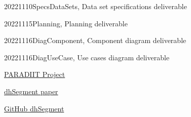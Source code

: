 \documentclass{polytech/polytech}
\numberwithin{figure}{chapter}
\begin{document}
\begin{appendix}
20221110SpecsDataSets, Data set specifications deliverable

20221115Planning, Planning deliverable

20221116DiagComponent, Component diagram deliverable

20221116DiagUseCase, Use cases diagram deliverable

\href{https://sites.google.com/site/paradiitproject/}{PARADIIT Project}

\href{https://arxiv.org/abs/1804.10371}{dhSegment paper}

\href{https://github.com/dhlab-epfl/dhSegment}{GitHub dhSegment}



\end{appendix}
\end{document}

